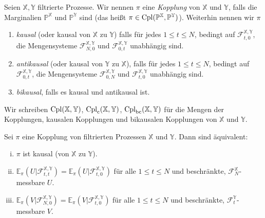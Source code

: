 \begin{definition}
Seien $\mathbb{X}, \mathbb{Y}$ filtrierte Prozesse. Wir nennen $\pi$ eine \emph{Kopplung} von $\mathbb{X}$ und $\mathbb{Y}$, falls die Marginalien $\mathbb{P}^\mathbb{X}$ und $\mathbb{P}^\mathbb{Y}$ sind (das heißt $\pi \in \operatorname{Cpl}(\mathbb{P}^\mathbb{X}, \mathbb{P}^\mathbb{Y})$). Weiterhin nennen wir $\pi$
\begin{enumerate}
\item \emph{kausal} (oder kausal von $\mathbb{X}$ zu $\mathbb{Y}$) falls für jedes $1\leq t\leq N$, bedingt auf $\mathcal{F}_{t, 0}^{\mathbb{X}, \mathbb{Y}}$, die Mengensysteme $\mathcal{F}_{N, 0}^{\mathbb{X}, \mathbb{Y}}$ und $\mathcal{F}_{0, t}^{\mathbb{X},\mathbb{Y}}$ unabhängig sind.
\item \emph{antikausal} (oder kausal von $\mathbb{Y}$ zu $\mathbb{X}$), falls für jedes $1 \leq t \leq N$, bedingt auf $\mathcal{F}_{0, t}^{\mathbb{X}, \mathbb{Y}}$, die Mengensysteme $\mathcal{F}_{0, N}^{\mathbb{X}, \mathbb{Y}}$ und $\mathcal{F}_{t, 0}^{\mathbb{X}, \mathbb{Y}}$ unabhängig sind.
\item \emph{bikausal}, falls es kausal und antikausal ist.
\end{enumerate}
Wir schreiben $\operatorname{Cpl}(\mathbb{X}, \mathbb{Y})$, $\operatorname{Cpl}_{\operatorname{c}}(\mathbb{X}, \mathbb{Y})$, $\operatorname{Cpl}_{\operatorname{bc}}(\mathbb{X}, \mathbb{Y})$ für die Mengen der Kopplungen, kausalen Kopplungen und bikausalen Kopplungen von $\mathbb{X}$ und $\mathbb{Y}$.
\end{definition}
\begin{lemma}\label{thm:causality_characterization}
Sei $\pi$ eine Kopplung von filtrierten Prozessen $\mathbb{X}$ und $\mathbb{Y}$. Dann sind äquivalent:
\begin{enumerate}[(i)]
\item $\pi$ ist kausal (von $\mathbb{X}$ zu $\mathbb{Y}$).
\item $\mathbb{E}_\pi(U \vert \mathcal{F}_{t, t}^{\mathbb{X}, \mathbb{Y}}) = \mathbb{E}_\pi(U \vert \mathcal{F}_{t, 0}^{\mathbb{X}, \mathbb{Y}})$ für alle $1\leq t\leq N$ und beschränkte, $\mathcal{F}_N^\mathbb{X}$-messbare $U$.
\item $\mathbb{E}_\pi(V\vert \mathcal{F}_{N, 0}^{\mathbb{X}, \mathbb{Y}}) = \mathbb{E}_\pi(V \vert \mathcal{F}_{t, 0}^{\mathbb{X}, \mathbb{Y}})$ für alle $1\leq t\leq N$ und beschränkte, $\mathcal{F}_t^\mathbb{Y}$-messbare $V$.
\end{enumerate}
\end{lemma}

